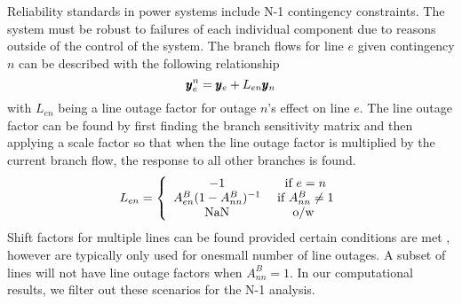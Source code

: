 Reliability standards in power systems include N-1 contingency constraints.  The system must be robust to failures of each individual component due to reasons outside of the control of the system. The branch flows for line $e$ given contingency $n$ can be described with the following relationship
\begin{equation}\label{n1cont}
 \pmb{y}_e^n = \pmb{y}_e + L_{e n} \pmb{y}_n 
\end{equation}
with $L_{en}$ being a line outage factor for outage $n$'s effect on line $e$.  The line outage factor can be found by first finding the branch sensitivity matrix and then applying a scale factor so that when the line outage factor is multiplied by the current branch flow, the response to all other branches is found.
\begin{equation}
L_{en} = \left\{ \begin{array}{c c}
  -1 & \mbox{ if } e=n\\
  A_{en}^B (1-A_{nn}^B)^{-1} & \mbox{ if } A_{nn}^B \neq 1\\
  \mbox{NaN} & \mbox{ o/w }
  \end{array}
\right.
\end{equation}
Shift factors for multiple lines can be found provided certain conditions are met \cite{guler_2007}, however are typically only used for onesmall number of line outages.  A subset of lines will not have line outage factors when $A_{nn}^B = 1$.  In our computational results, we filter out these scenarios for the N-1 analysis.


